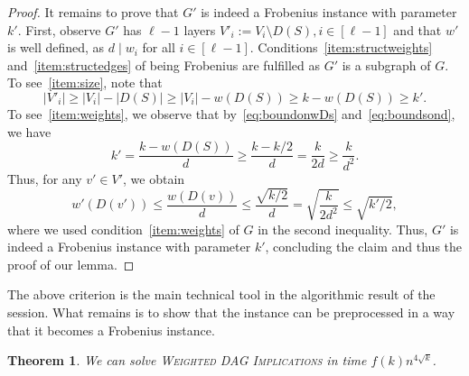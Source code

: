 \documentclass[10pt,a4paper]{article}
\theoremstyle{plain}
\newtheorem{thm}{Theorem}[section]
\newcommand{\wDAGImplication}{\textsc{Weighted DAG Implications}\xspace}
\newcommand{\divides}{\mid}
\begin{document}
\begin{proof}
%
It remains to prove that $G'$ is indeed a Frobenius instance with parameter $k'$. First, observe $G'$ has $\ell-1$ layers $V'_i := V_i \setminus D(S), i\in [\ell-1]$ and that $w'$ is well defined, as $d\divides w_i$ for all $i\in [\ell-1]$. Conditions~\ref{item:structweights} and~\ref{item:structedges} of being Frobenius are fulfilled as $G'$ is a subgraph of $G$. To see~\ref{item:size}, note that 
\[ |V'_i| \ge |V_i| - |D(S)| \ge |V_i|- w(D(S)) \ge k-w(D(S)) \ge k'. \]
To see~\ref{item:weights}, we observe that by~\eqref{eq:boundonwDs} and~\eqref{eq:boundsond}, we have
\[ k' = \frac{k-w(D(S))}{d} \ge \frac{k-k/2}{d} = \frac{k}{2d} \ge \frac{k}{d^2}. \]
Thus, for any $v'\in V'$, we obtain
\[ w'(D(v')) \le \frac{w(D(v))}{d} \le \frac{\sqrt{k/2}}{d} = \sqrt{\frac{k}{2d^2}} \le \sqrt{k'/2}, \]
where we used condition~\ref{item:weights} of $G$ in the second inequality. Thus, $G'$ is indeed a Frobenius instance with parameter $k'$, concluding the claim and thus the proof of our lemma.
\end{proof}
%
%
The above criterion is the main technical tool in the algorithmic result of the session. What remains is to show that the instance can be preprocessed in a way that it becomes a Frobenius instance.
\begin{thm}\label{thm:implalgo}
We can solve \wDAGImplication in time $f(k)n^{4\sqrt{k}}$.
\end{thm}
\end{document}

